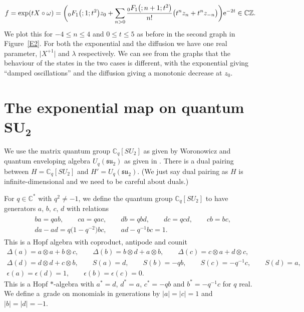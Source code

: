 \documentclass[pdftex]{sigma}
\numberwithin{equation}{section}
\newcommand{\tens}{\mathop{\otimes}}
\newcommand{\C}{\mathbb{C}}
\newcommand{\Z}{\mathbb{Z}}
\newcommand{\<}{\langle}
\renewcommand{\>}{\rangle}
\begin{document}
	\begin{gather*}
f=\exp(tX\circ \omega )=\bigg( {}_{0}F_{1}\big(;1;t^{2}\big)z_{0}+ \sum_{n > 0}\dfrac{{}_{0}F_{1} \big(;n+1;t^{2}\big)}{n!}\big( t^{n}z_{n }+t^{n}z_{-n }\big)\bigg){\rm e}^{-2t}\in \C \Z.
\end{gather*}
We plot this for $ -4\leq n\leq 4 $ and $ 0\leq t\leq 5$ as before in the second graph in Figure~\ref{E2}. For both the exponential and the diffusion we have one real parameter, $ \big|X^{+1}\big| $ and $ \lambda $ respectively. We can see from the graphs that the behaviour of the states in the two cases is different, with the exponential giving ``damped oscillations'' and the diffusion giving a monotonic decrease at $ z_{0} $.

\section[The exponential map on quantum SU\_2]{The exponential map on quantum $\boldsymbol{SU_{2}}$}

We use the matrix quantum group $ \C_{q}[SU_{2}] $ as given by Woronowicz \cite{WoroMatl} and quantum enveloping algebra $ U_{q}({\mathfrak{su}}_{2}) $ as given in \cite{PPKa, EKSk}. There is a dual pairing between $ H=\C_{q}[SU_{2}] $ and \mbox{$ H'=U_{q}({\mathfrak{su}}_{2}) $}. (We just say dual pairing as $ H $ is infinite-dimensional and we need to be careful about duals.)

\begin{Definition}
For $ q\in \mathbb{C}^{*} $ with $ q^{2}\neq -1 $, we define the quantum group $ \C_{q}[SU_{2}]$ to have generators $ a$, $b$, $c$, $d $ with relations
\begin{gather*}
\begin{split}
& b a=q a b, \qquad ca = q a c, \qquad d b=q b d,\qquad d c=q c d, \qquad c b=b c,\\
& d a - a d = q\big(1-q^{-2}\big)b c, \qquad a d-q^{-1}b c=1.
\end{split}
\end{gather*}
	This is a Hopf algebra with coproduct, antipode and counit
	\begin{gather*}
		\Delta(a)= a \tens a+b\tens c, \qquad 	\Delta(b)=b \tens d+a \tens b, \qquad 	\Delta(c)=c \tens a+d \tens c, \\
\Delta(d)=d\tens d+c\tens b,\qquad
		S(a)=d, \qquad 	S(b)=-qb, \qquad 	S(c)= -q^{-1}c, \qquad S(d)= a,\\
		\epsilon (a)=\epsilon (d)=1, \qquad \epsilon (b)=\epsilon (c)=0.
	\end{gather*}
		This is a Hopf $ * $-algebra with $a^{*} = d$, $d^{*} = a$, $c^{*}=-qb$ and $b^{*}=-q^{-1} c$ for $ q $ real. We define a~grade on monomials in generations by $ |a|=|c|=1$ and $|b|=|d|=-1$.
	\end{Definition}
\end{document}
